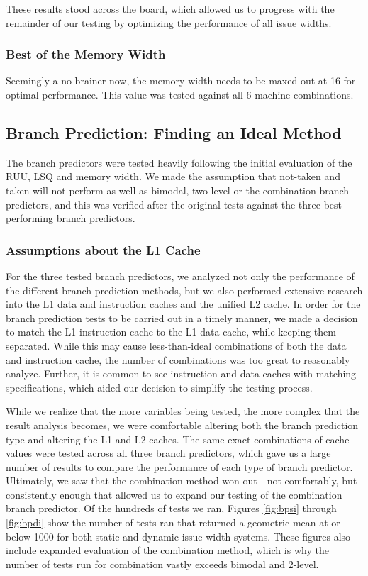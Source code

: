 \documentclass[paper=a4, fontsize=12pt]{scrartcl} %
\numberwithin{equation}{section} %
\numberwithin{figure}{section} %
\numberwithin{table}{section} %
\begin{document}
These results stood across the board, which allowed us to progress with the remainder of our testing by optimizing the performance of all issue widths.

\subsubsection{Best of the Memory Width}

Seemingly a no-brainer now, the memory width needs to be maxed out at 16 for optimal performance. This value was tested against all 6 machine combinations.


\subsection{Branch Prediction: Finding an Ideal Method}

The branch predictors were tested heavily following the initial evaluation of the RUU, LSQ and memory width. We made the assumption that not-taken and taken will not perform as well as bimodal, two-level or the combination branch predictors, and this was verified after the original tests against the three best-performing branch predictors.

\subsubsection{Assumptions about the L1 Cache}

For the three tested branch predictors, we analyzed not only the performance of the different branch prediction methods, but we also performed extensive research into the L1 data and instruction caches and the unified L2 cache. In order for the branch prediction tests to be carried out in a timely manner, we made a decision to match the L1 instruction cache to the L1 data cache, while keeping them separated. While this may cause less-than-ideal combinations of both the data and instruction cache, the number of combinations was too great to reasonably analyze. Further, it is common to see instruction and data caches with matching specifications, which aided our decision to simplify the testing process.

While we realize that the more variables being tested, the more complex that the result analysis becomes, we were comfortable altering both the branch prediction type and altering the L1 and L2 caches. The same exact combinations of cache values were tested across all three branch predictors, which gave us a large number of results to compare the performance of each type of branch predictor. Ultimately, we saw that the combination method won out - not comfortably, but consistently enough that allowed us to expand our testing of the combination branch predictor. Of the hundreds of tests we ran, Figures \ref{fig:bpsi} through \ref{fig:bpdi} show the number of tests ran that returned a geometric mean at or below 1000 for both static and dynamic issue width systems. These figures also include expanded evaluation of the combination method, which is why the number of tests run for combination vastly exceeds bimodal and 2-level.
\end{document}
